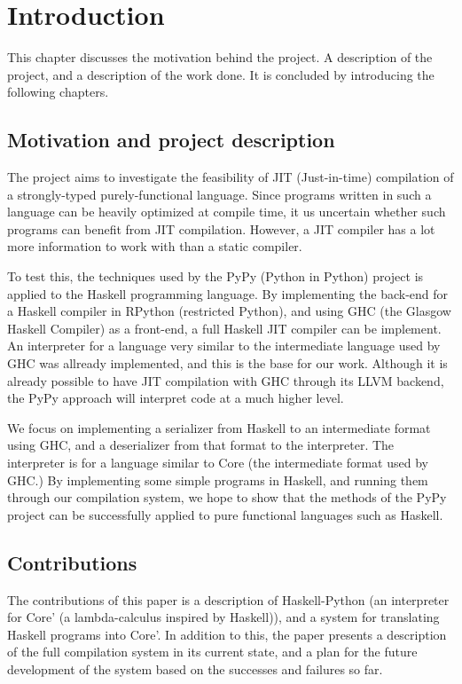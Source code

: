 
\chapter{Introduction}

This chapter discusses the motivation behind the project. A description
of the project, and a description of the work done. It is concluded by 
introducing the following chapters.

\section{Motivation and project description}

The project aims to investigate the feasibility of JIT (Just-in-time) 
compilation of a strongly-typed purely-functional language. Since
programs written in such a language can be heavily optimized at 
compile time, it us uncertain whether such programs can benefit from
JIT compilation. However, a JIT compiler has a lot more information to
work with than a static compiler. 

To test this, the techniques 
used by the PyPy (Python in Python) project is applied to the Haskell 
programming language. By implementing the back-end for a Haskell compiler 
in RPython (restricted Python), and using GHC (the Glasgow Haskell Compiler) 
as a front-end, a full Haskell JIT compiler can be implement. An 
interpreter for a language very similar to the intermediate language used
by GHC was allready implemented, and this is the base for our work.
Although it is already possible to have JIT compilation with GHC through
its LLVM backend, the PyPy approach will interpret code at a much higher level.

We focus on implementing a serializer from Haskell to an intermediate
format using GHC, and a deserializer from that format to the interpreter. The 
interpreter is for a language similar to Core (the intermediate format used by GHC.)
By implementing some simple programs in Haskell, and running them through our 
compilation system, 
we hope to show that the methods of the PyPy project can be successfully applied 
to pure functional languages such as Haskell.


\section{Contributions}
The contributions of this paper is a description of Haskell-Python (an
interpreter for Core' (a lambda-calculus inspired by Haskell)), and a system for
translating Haskell programs into Core'. In addition to this, the paper 
presents a description of the full compilation system in its current state,
and a plan for the future development of the system based on the 
successes and failures so far.

